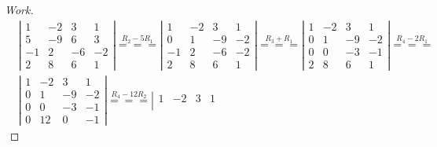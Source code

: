 \documentclass{article}
\begin{document}
\begin{proof}[Work]
  \begin{align*}
     & \left\lvert \begin{array}{cccc}
                     1  & -2 & 3  & 1  \\
                     5  & -9 & 6  & 3  \\
                     -1 & 2  & -6 & -2 \\
                     2  & 8  & 6  & 1
                   \end{array} \right\rvert \overset{R_2 - 5R_1}{===}
    \left\lvert \begin{array}{cccc}
                  1  & -2 & 3  & 1  \\
                  0  & 1  & -9 & -2 \\
                  -1 & 2  & -6 & -2 \\
                  2  & 8  & 6  & 1
                \end{array} \right\rvert \overset{R_3 + R_1}{===}
    \left\lvert \begin{array}{cccc}
                  1 & -2 & 3  & 1  \\
                  0 & 1  & -9 & -2 \\
                  0 & 0  & -3 & -1 \\
                  2 & 8  & 6  & 1
                \end{array} \right\rvert \overset{R_4 - 2R_1}{===}                       \\
     & \left\lvert \begin{array}{cccc}
                     1 & -2 & 3  & 1  \\
                     0 & 1  & -9 & -2 \\
                     0 & 0  & -3 & -1 \\
                     0 & 12 & 0  & -1
                   \end{array} \right\rvert \overset{R_4 - 12R_2}{===}
    \left\lvert \begin{array}{cccc}
                  1 & -2 & 3   & 1  \\

\end{array}
\end{align*}
\end{proof}
\end{document}
